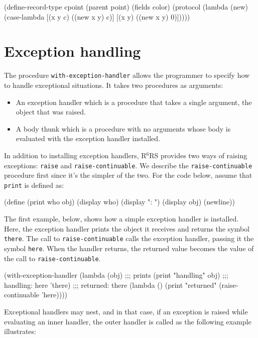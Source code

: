\documentclass[onecolumn, 12pt, twoside, openright, dvipdfm]{book}
\newcommand{\rnrs}[1]{R$^{\mathrm{#1}}$RS}
\begin{document}
\newpage
\begin{CodeInline}
(define-record-type cpoint
  (parent point) 
  (fields color) 
  (protocol
    (lambda (new) 
      (case-lambda 
        [(x y c) ((new x y) c)]
        [(x y)   ((new x y) 0)]))))
\end{CodeInline}


\section{Exception handling}

The procedure \texttt{with-exception-handler} allows the programmer
to specify how to handle exceptional situations.  It takes two
procedures as arguments: 
\begin{itemize}
\item An exception handler which is a procedure that takes a
single argument, the object that was raised.
\item A body thunk which is a procedure with no arguments whose body
is evaluated with the exception handler installed.
\end{itemize}

In addition to installing exception handlers, \rnrs{6} provides two
ways of raising exceptions: \texttt{raise} and
\texttt{raise-continuable}.  We describe the 
\texttt{raise-continuable} procedure
first since it's the simpler of the two.  
For the code below, assume that \texttt{print} is defined as:
\begin{CodeInline}
(define (print who obj)
  (display who) 
  (display ": ")
  (display obj)
  (newline))
\end{CodeInline}

The first example, below, shows how a simple exception handler is
installed.  Here, the exception handler prints the object it
receives and returns the symbol \texttt{there}.  The call to
\texttt{raise-continuable} calls the exception handler, passing it
the symbol \texttt{here}.  When the handler returns, the returned
value becomes the value of the call to \texttt{raise-continuable}.

\begin{CodeInline}
(with-exception-handler
  (lambda (obj)                         ;;; prints
    (print "handling" obj)              ;;;   handling: here
    'there)                             ;;;   returned: there
  (lambda ()
    (print "returned" (raise-continuable 'here))))
\end{CodeInline}

Exceptional handlers may nest, and in that case, if an exception is
raised while evaluating an inner handler, the outer handler is
called as the following example illustrates:
\end{document}
